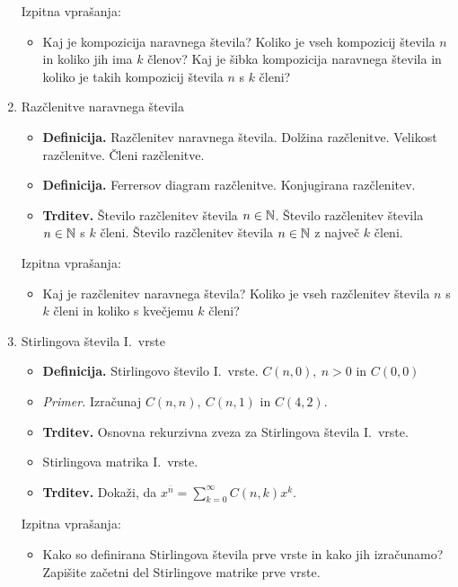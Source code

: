 \begin{enumerate}
    Izpitna vprašanja:
    \begin{itemize}
        \item Kaj je kompozicija naravnega števila? Koliko je vseh kompozicij števila \(n\) in koliko jih ima \(k\) členov? Kaj je šibka kompozicija naravnega števila in koliko je takih kompozicij števila \(n\) s \(k\) členi?
    \end{itemize}

    \item Razčlenitve naravnega števila
    \begin{itemize}
        \item \colorbox{purple!30}{\textbf{Definicija.}} Razčlenitev naravnega števila. Dolžina razčlenitve. Velikost razčlenitve. Členi razčlenitve.
        \item \colorbox{purple!30}{\textbf{Definicija.}} Ferrersov diagram razčlenitve. Konjugirana razčlenitev.
        \item \colorbox{blue!30}{\textbf{Trditev.}} Število razčlenitev števila \(n \in \mathbb{N}\). Število razčlenitev števila \(n \in \mathbb{N}\) s \(k\) členi. Število razčlenitev števila \(n \in \mathbb{N}\) z največ \(k\) členi. 
    \end{itemize}

    Izpitna vprašanja:
    \begin{itemize}
        \item Kaj je razčlenitev naravnega števila? Koliko je vseh razčlenitev števila \(n\) s \(k\) členi in koliko s kvečjemu \(k\) členi?
    \end{itemize}

    \item Stirlingova števila I.\ vrste
    \begin{itemize}
        \item \colorbox{purple!30}{\textbf{Definicija.}} Stirlingovo število I.\ vrste. \(C(n,0), \ n > 0\) in \(C(0,0)\)
        \item \colorbox{yellow!30}{\emph{Primer.}} Izračunaj \(C(n,n), \ C(n, 1)\) in \(C(4, 2)\). 
        \item \colorbox{blue!30}{\textbf{Trditev.}} Osnovna rekurzivna zveza za Stirlingova števila I.\ vrste.
        \item Stirlingova matrika I.\ vrste.
        \item \colorbox{blue!30}{\textbf{Trditev.}} Dokaži, da \(x^{\overline{n}} = \sum_{k=0}^{\infty}C(n,k)x^k\).
    \end{itemize}

    Izpitna vprašanja:
    \begin{itemize}
        \item Kako so definirana Stirlingova števila prve vrste in kako jih izračunamo? Zapišite začetni del Stirlingove matrike prve vrste.
    \end{itemize}


\end{enumerate}
